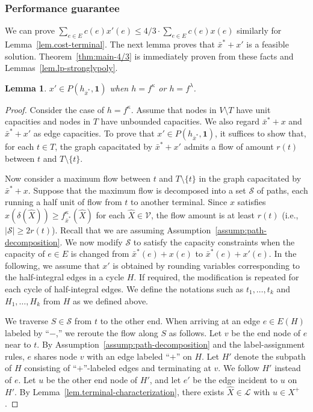 \documentclass{article}
\newtheorem{lemma}{Lemma}
\newcommand{\Vfam}{\mathcal{V}}
\newcommand{\Lfam}{\mathcal{L}}
\newcommand{\Sfam}{\mathcal{S}}
\newcommand{\allone}{\mathbf{1}}
\newcommand{\cut}{P}
\newcommand{\f}{f^{\kappa}}
\newcommand{\g}{f^{\lambda}}
\begin{document}
\subsubsection*{Performance guarantee}

We can prove
$\sum_{e \in E}c(e)x'(e) \leq 4/3 \cdot \sum_{e \in E}c(e)x(e)$
similarly for Lemma~\ref{lem.cost-terminal}.
The next lemma proves that $\bar{x}^*+x'$ is a feasible solution.
Theorem~\ref{thm:main-4/3} is immediately proven from
these facts and Lemmas~\ref{lem.lp-stronglypoly}.



\begin{lemma}\label{lem.feasibility}
 $x' \in \cut(h_{\bar{x}^*},\allone)$ when $h=\f$ or $h=\g$.
\end{lemma}
\begin{proof}
Consider the case of $h=\f$.
Assume that 
nodes in $V\setminus T$ have unit capacities
and nodes in $T$ have unbounded capacities.
We also regard 
$\bar{x}^*+x$ and $\bar{x}^*+x'$ as edge capacities.
To prove that $x' \in \cut(h_{\bar{x}^*},\allone)$, 
it suffices to show that, for each $t \in T$,
the graph capacitated by $\bar{x}^*+x'$ admits
a flow of amount $r(t)$
between $t$ and $T\setminus \{t\}$.

Now consider a maximum flow between $t$ and $T\setminus \{t\}$
in the graph capacitated by $\bar{x}^*+x$.
Suppose that the maximum flow is decomposed into a set 
$\Sfam$ of paths, each running a half unit of flow from $t$ to another terminal.
Since $x$ satisfies $x(\delta(\hat{X})) \geq \f_{\bar{x}^*}(\hat{X})$
for each $\hat{X}\in \Vfam$,
the flow amount is at least $r(t)$ (i.e., $|\Sfam|\geq 2r(t)$).
Recall that we are assuming Assumption~\ref{assump:path-decomposition}.
We now modify $\Sfam$ to satisfy the capacity constraints when 
the capacity of $e \in E$ is changed from $\bar{x}^*(e) + x(e)$ to $\bar{x}^*(e) + x'(e)$.
In the following, we assume that $x'$ is obtained by rounding variables corresponding to 
the half-integral edges in a cycle $H$. If required, the modification is repeated for each cycle
of half-integral edges.
We define the notations such as $t_1,\ldots,t_{k}$ and $H_1,\ldots,H_k$
 from $H$ as we defined above.


We traverse $S \in \Sfam$ from $t$ to the other end.
When arriving at an edge $e \in E(H)$ labeled by ``$-$,''
we reroute the flow along $S$ as follows.
Let $v$ be the end node of $e$ near to $t$.
By Assumption~\ref{assump:path-decomposition} and the label-assignment rules,
$e$ shares node $v$ with an edge labeled ``$+$'' on $H$.
Let $H'$ denote the subpath of $H$ consisting of ``$+$''-labeled edges and terminating at $v$.
We follow $H'$ instead of $e$.
Let $u$ be the other end node of $H'$,
and let $e'$ be the edge incident to $u$ on $H'$.
By Lemma~\ref{lem.terminal-characterization}, there exists $\hat{X}\in \Lfam$ with $u \in X^+$.


\end{proof}
\end{document}
